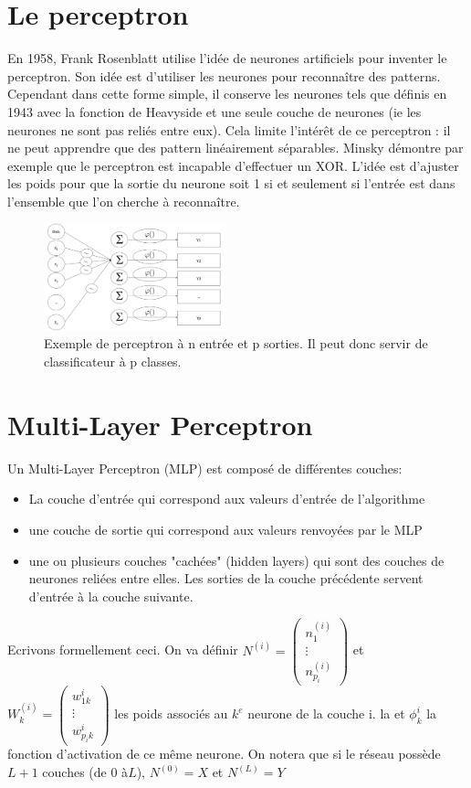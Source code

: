 \section{Le perceptron}
En 1958, Frank Rosenblatt utilise l'idée de neurones artificiels pour inventer le perceptron. Son idée est d'utiliser les neurones pour reconnaître des patterns. Cependant dans cette forme simple, il conserve les neurones tels que définis en 1943 avec la fonction de Heavyside et une seule couche de neurones (ie les neurones ne sont pas reliés entre eux). Cela limite l'intérêt de ce perceptron : il ne peut apprendre que des pattern linéairement séparables. Minsky démontre par exemple que le perceptron est incapable d'effectuer un XOR.
L'idée est d'ajuster les poids pour que la sortie du neurone soit 1 si et seulement si l'entrée est dans l'ensemble que l'on cherche à reconnaître. 

\begin{figure}[!h]
\centering
\includegraphics[width=150pt,valign=t]{"images/MLP/perceptron"}
\caption{Exemple de perceptron à n entrée et p sorties. Il peut donc servir de classificateur à p classes.}
\label{perceptron}
\end{figure}

\section{Multi-Layer Perceptron}
Un Multi-Layer Perceptron (MLP) est composé de différentes couches: \begin{itemize}
\item La couche d'entrée qui correspond aux valeurs d'entrée de l'algorithme
\item une couche de sortie qui correspond aux valeurs renvoyées par le MLP
\item une ou plusieurs couches "cachées" (hidden layers) qui sont des couches de neurones reliées entre elles. Les sorties de la couche précédente servent d'entrée à la couche suivante.

\end{itemize}

Ecrivons formellement ceci. On va définir $N^(i)  = \begin{pmatrix} n_1^(i)\\ \vdots \\ n_{p_i}^(i) \end{pmatrix}$  et 
$W_k^(i) = \begin{pmatrix} w_{1k}^i\\ \vdots \\ w_{p_ik}^i \end{pmatrix}$ les poids associés au $k^e$ neurone de la couche i. la  et $\phi_k^i$ la fonction d'activation de ce même neurone. 
On notera que si le réseau possède $L+1$ couches (de $0$ à$ L$), $N^(0) = X$ et $N^(L) = Y$

